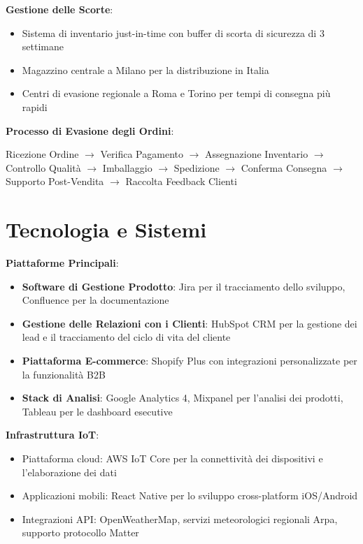 \documentclass[11pt,a4paper]{report}
\begin{document}
\textbf{Gestione delle Scorte}:
\begin{itemize}
    \item Sistema di inventario just-in-time con buffer di scorta di sicurezza di 3 settimane
    \item Magazzino centrale a Milano per la distribuzione in Italia
    \item Centri di evasione regionale a Roma e Torino per tempi di consegna più rapidi
\end{itemize}

\textbf{Processo di Evasione degli Ordini}:

\begin{center}
Ricezione Ordine $\rightarrow$ Verifica Pagamento $\rightarrow$ Assegnazione Inventario $\rightarrow$ Controllo Qualità $\rightarrow$ Imballaggio $\rightarrow$ Spedizione $\rightarrow$ Conferma Consegna $\rightarrow$ Supporto Post-Vendita $\rightarrow$ Raccolta Feedback Clienti
\end{center}

\section{Tecnologia e Sistemi}
\textbf{Piattaforme Principali}:
\begin{itemize}
    \item \textbf{Software di Gestione Prodotto}: Jira per il tracciamento dello sviluppo, Confluence per la documentazione
    \item \textbf{Gestione delle Relazioni con i Clienti}: HubSpot CRM per la gestione dei lead e il tracciamento del ciclo di vita del cliente
    \item \textbf{Piattaforma E-commerce}: Shopify Plus con integrazioni personalizzate per la funzionalità B2B
    \item \textbf{Stack di Analisi}: Google Analytics 4, Mixpanel per l'analisi dei prodotti, Tableau per le dashboard esecutive
\end{itemize}

\textbf{Infrastruttura IoT}:
\begin{itemize}
    \item Piattaforma cloud: AWS IoT Core per la connettività dei dispositivi e l'elaborazione dei dati
    \item Applicazioni mobili: React Native per lo sviluppo cross-platform iOS/Android
    \item Integrazioni API: OpenWeatherMap, servizi meteorologici regionali Arpa, supporto protocollo Matter
\end{itemize}
\end{document}
